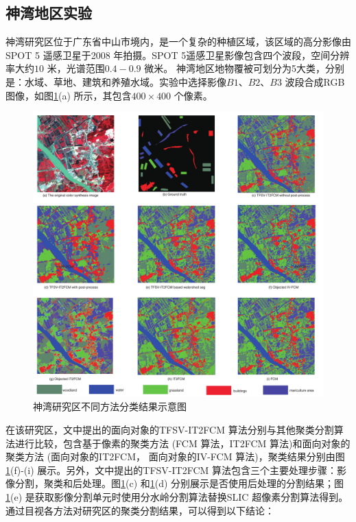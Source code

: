 \subsection{神湾地区实验}
\label{subsec::chap03-4-1}
神湾研究区位于广东省中山市境内，是一个复杂的种植区域，该区域的高分影像由SPOT 5 遥感卫星于2008 年拍摄。SPOT 5遥感卫星影像包含四个波段，空间分辨率大约$10$ 米，光谱范围$0.4-0.9$ 微米。 神湾地区地物覆被可划分为5大类，分别是：水域、草地、建筑和养殖水域。实验中选择影像$B1$、$B2$、$B3$ 波段合成RGB 图像，如图\ref{fig:shenwan}(a) 所示，其包含$400 \times 400$ 个像素。

\begin{figure}[htb]
    \centering
    \includegraphics[width=1.0\textwidth]{figures/shenwan}
    \caption{神湾研究区不同方法分类结果示意图 }\label{fig:shenwan}
\end{figure}

在该研究区，文中提出的面向对象的TFSV-IT2FCM 算法分别与其他聚类分割算法进行比较，包含基于像素的聚类方法 (FCM 算法，IT2FCM 算法)和面向对象的聚类方法 (面向对象的IT2FCM， 面向对象的IV-FCM 算法)，聚类结果分别由图\ref{fig:shenwan}(f)-(i) 展示。另外，文中提出的TFSV-IT2FCM 算法包含三个主要处理步骤：影像分割，聚类和后处理。图\ref{fig:shenwan}(c) 和\ref{fig:shenwan}(d) 分别展示是否使用后处理的分割结果；图\ref{fig:shenwan}(e) 是获取影像分割单元时使用分水岭分割算法替换SLIC 超像素分割算法得到。通过目视各方法对研究区的聚类分割结果，可以得到以下结论：

